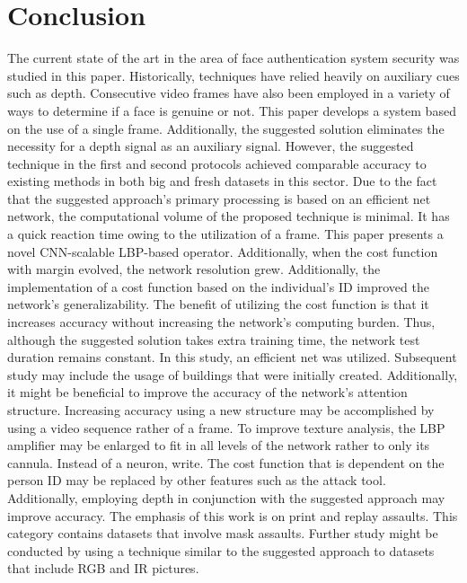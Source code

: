 \documentclass[journal]{IEEEtran}
\begin{document}
\section{Conclusion}
The current state of the art in the area of face authentication system security was studied in this paper. Historically, techniques have relied heavily on auxiliary cues such as depth. Consecutive video frames have also been employed in a variety of ways to determine if a face is genuine or not. This paper develops a system based on the use of a single frame. Additionally, the suggested solution eliminates the necessity for a depth signal as an auxiliary signal. However, the suggested technique in the first and second protocols achieved comparable accuracy to existing methods in both big and fresh datasets in this sector.
Due to the fact that the suggested approach's primary processing is based on an efficient net network, the computational volume of the proposed technique is minimal. It has a quick reaction time owing to the utilization of a frame.
This paper presents a novel CNN-scalable LBP-based operator. Additionally, when the cost function with margin evolved, the network resolution grew. Additionally, the implementation of a cost function based on the individual's ID improved the network's generalizability. The benefit of utilizing the cost function is that it increases accuracy without increasing the network's computing burden. Thus, although the suggested solution takes extra training time, the network test duration remains constant.
In this study, an efficient net was utilized. Subsequent study may include the usage of buildings that were initially created. Additionally, it might be beneficial to improve the accuracy of the network's attention structure. Increasing accuracy using a new structure may be accomplished by using a video sequence rather of a frame. To improve texture analysis, the LBP amplifier may be enlarged to fit in all levels of the network rather to only its cannula. Instead of a neuron, write. The cost function that is dependent on the person ID may be replaced by other features such as the attack tool. Additionally, employing depth in conjunction with the suggested approach may improve accuracy.
The emphasis of this work is on print and replay assaults. This category contains datasets that involve mask assaults. Further study might be conducted by using a technique similar to the suggested approach to datasets that include RGB and IR pictures.
\end{document}
